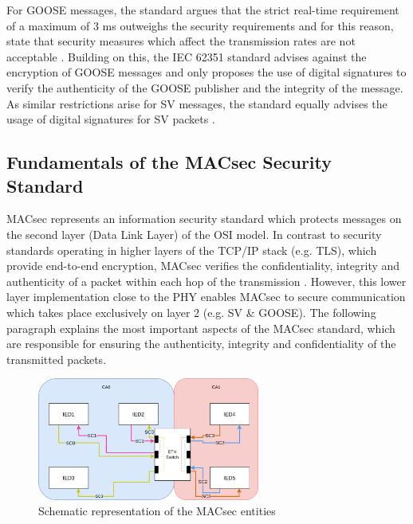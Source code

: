 \documentclass[conference, onecolumn, a4paper]{IEEEtran}
\begin{document}
\smallskip
For GOOSE messages, the standard argues that the strict real-time requirement of a maximum of 3 ms \cite{GOOSE_confidentiality_integrity:2020} outweighs 
the security requirements and for this reason, state that security measures which affect the transmission rates are not acceptable \cite{PoisonedGOOSE:2014}. 
Building on this, the IEC 62351 standard advises against the encryption of GOOSE messages and only proposes the use of digital signatures to verify the 
authenticity of the GOOSE publisher and the integrity of the message. As similar restrictions arise for SV messages, the standard equally advises the 
usage of digital signatures for SV packets \cite{Review_IEC62351:2019}. 

\subsection{Fundamentals of the MACsec Security Standard}
\noindent MACsec represents an information security standard which protects messages on the second layer (Data Link Layer) of the OSI model. In contrast 
to security standards operating in higher layers of the TCP/IP stack (e.g. TLS), which provide end-to-end encryption, MACsec verifies the confidentiality, 
integrity and authenticity of a packet within each hop of the transmission \cite{Cybersecurity_Substation:2016}. However, this lower layer implementation 
close to the PHY enables MACsec to secure communication which takes place exclusively on layer 2 (e.g. SV \& GOOSE). The following paragraph explains the 
most important aspects of the MACsec standard, which are responsible for ensuring the authenticity, integrity and confidentiality of the transmitted packets.

\begin{figure}[h]
    \centering
    \includegraphics[width=0.65\textwidth]{images/MACsec_Entities_Diagram.png}
    \caption{Schematic representation of the MACsec entities \cite{IEEE-802-1AE:2018}}
    \label{image:MACsecEntities}
\end{figure}
\end{document}
